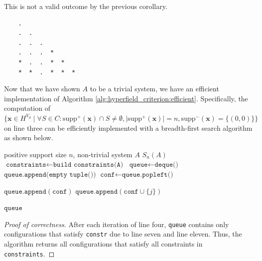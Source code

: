 \begin{example}
This is not a valid outcome by the previous corollary.
    \begin{verbatim}
    .               
    .  .           
    .  .  .
    .  .  .  *
    *  .  .  *  *
    *  *  .  *  *  *
\end{verbatim}
\end{example}

Now that we have shown $A$ to be a trivial system, we have an efficient implementation of Algorithm \ref{alg:hyperfield_criterion:efficient}. Specifically, the computation of \( \{ \mathbf{x} \in H^{V_{d}} \mid \forall S \in C: \mathrm{supp}^+(\mathbf{\mathbf{x}}) \cap S \neq \emptyset, \vert \mathrm{supp}^+(\mathbf{x}) \vert = n,  \mathrm{supp}^-(\mathbf{x}) = \{(0,0)\}   \} \) on line three can be efficiently implemented with a breadth-first search algorithm as shown below.

\begin{algorithm}[H]
\caption{Efficient Implementation of Algorithm \ref{alg:hyperfield_criterion:efficient} for non-trivial \( A \)}
\label{alg:solve}
\begin{algorithmic}[1]
\Require positive support size \( n \), non-trivial system \( A \)
\Ensure \( S_n(A) \)
\State $\texttt{constraints} \gets \texttt{build constraints(A)}$
\State $\texttt{queue} \gets \texttt{deque()}$
\State $\texttt{queue.append(empty tuple())}$
        \State $\texttt{conf} \gets \texttt{queue.popleft()}$

            \State $\texttt{queue.append}(\texttt{conf})$
                \State $\texttt{queue.append}(\texttt{conf} \cup \{j\})$
            \EndFor
        \EndIf
    \EndFor
\EndFor

\State \Return $ \texttt{queue}$
\end{algorithmic}
\end{algorithm}

\begin{proof}[Proof of correctness]
    After each iteration of line four, \texttt{queue} contains only configurations that satisfy \texttt{constr} due to line seven and line eleven. Thus, the algorithm returns all configurations that satisfy all constraints in \texttt{constraints}.
\end{proof}

